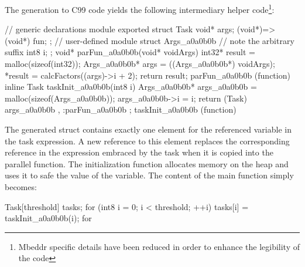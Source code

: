 The generation to C99 code yields the following intermediary helper code\footnote{Mbeddr specific details have been reduced in order to enhance the legibility of the code}:
\begin{ccode}
// generic declarations module
exported struct Task {
  void* args; 
  (void*)=>(void*) fun; 
};
// user-defined module
struct Args_a0a0b0b { // note the arbitrary suffix
  int8 i;             
};
void* parFun_a0a0b0b(void* voidArgs) { 
  int32* result = malloc(sizeof(int32)); 
  Args_a0a0b0b* args = ((Args_a0a0b0b*) voidArgs); 
  *result = calcFactors((args)->i + 2); 
  return result; 
} parFun_a0a0b0b (function)             
inline Task taskInit_a0a0b0b(int8 i) { 
  Args_a0a0b0b* args_a0a0b0b = malloc(sizeof(Args_a0a0b0b)); 
  args_a0a0b0b->i = i; 
  return (Task){ args_a0a0b0b , :parFun_a0a0b0b }; 
} taskInit_a0a0b0b (function)
\end{ccode}
The generated struct contains exactly one element for the referenced variable in the task expression. A new reference to this element replaces the corresponding reference in the expression embraced by the task when it is copied into the parallel function. The initialization function allocates memory on the heap and uses it to safe the value of the variable. The content of the main function simply becomes:
\begin{ccode}
Task[threshold] tasks; 
for (int8 i = 0; i < threshold; ++i) { 
  tasks[i] = taskInit_a0a0b0b(i); 
} for
\end{ccode}